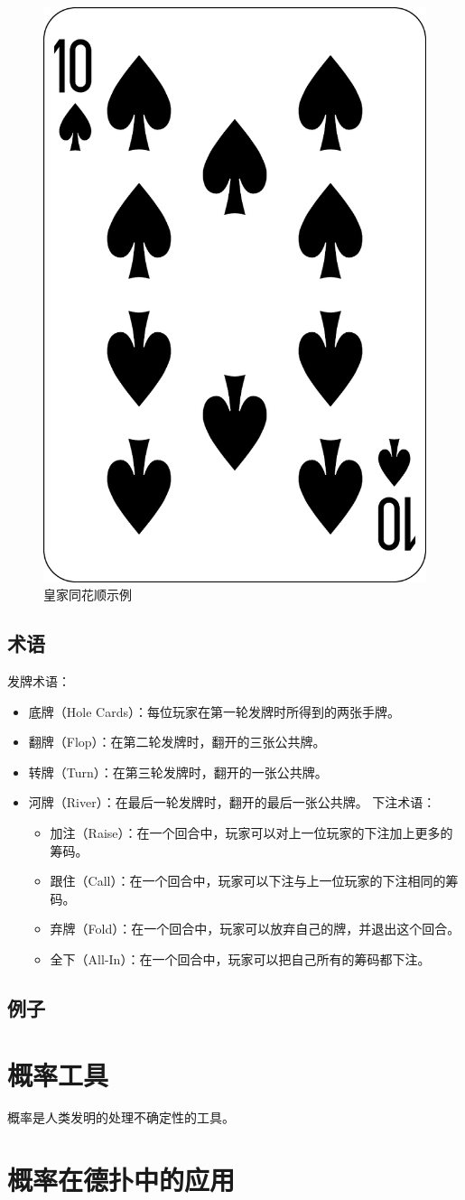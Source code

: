 \documentclass[UTF8]{ctexart}
\begin{document}
\begin{itemize}
\begin{figure}[h]
        \includegraphics[width=.19\linewidth]{spade_10.pdf} 
        \caption{\label{fig:royal_straight_flush}皇家同花顺示例}
    \end{figure}
\end{itemize}
\subsection{术语}
发牌术语：
\begin{itemize}
    \item 底牌（Hole Cards）：每位玩家在第一轮发牌时所得到的两张手牌。
    \item 翻牌（Flop）：在第二轮发牌时，翻开的三张公共牌。
    \item 转牌（Turn）：在第三轮发牌时，翻开的一张公共牌。
    \item 河牌（River）：在最后一轮发牌时，翻开的最后一张公共牌。
下注术语：
\begin{itemize}
    \item 加注（Raise）：在一个回合中，玩家可以对上一位玩家的下注加上更多的筹码。
    \item 跟住（Call）：在一个回合中，玩家可以下注与上一位玩家的下注相同的筹码。
    \item 弃牌（Fold）：在一个回合中，玩家可以放弃自己的牌，并退出这个回合。
    \item 全下（All-In）：在一个回合中，玩家可以把自己所有的筹码都下注。
\end{itemize}
\end{itemize}
\subsection{例子}
\newpage
\section{概率工具}
概率是人类发明的处理不确定性的工具。
\section{概率在德扑中的应用}
\end{document}
